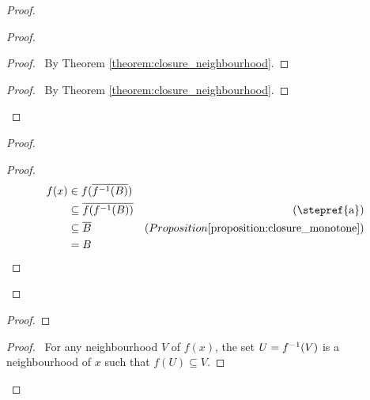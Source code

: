 \begin{proof}
    \pf
    \begin{proof}
        \begin{proof}
            \pf\ By Theorem \ref{theorem:closure_neighbourhood}.
        \end{proof}
        \qedstep
        \begin{proof}
            \pf\ By Theorem \ref{theorem:closure_neighbourhood}.
        \end{proof}
    \end{proof}
    \begin{proof}
        \begin{proof}
            \pf
            \begin{align*}
                f(x) & \in f(\overline{\inv{f}(B)}) \\
                & \subseteq \overline{f(\inv{f}(B))} & (\text{\stepref{a}})\\
                & \subseteq \overline{B} & (Proposition \ref{proposition:closure_monotone}) \\
                & = B
            \end{align*}
        \end{proof}
    \end{proof}
    \begin{proof}
    \end{proof}
    \begin{proof}
        \pf\ For any neighbourhood $V$ of $f(x)$, the set $U = {f}^{-1}(V)$ is a neighbourhood of $x$ such that
        $f(U) \subseteq V$.

\end{proof}
\end{proof}
